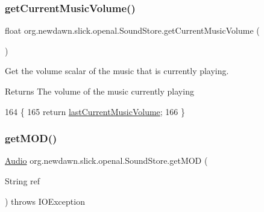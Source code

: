 \mbox{\label{classorg_1_1newdawn_1_1slick_1_1openal_1_1_sound_store_a36021d810d6956ef906c1083f02bed2b}} 
\subsubsection{\texorpdfstring{get\+Current\+Music\+Volume()}{getCurrentMusicVolume()}}
{\footnotesize\ttfamily float org.\+newdawn.\+slick.\+openal.\+Sound\+Store.\+get\+Current\+Music\+Volume (\begin{DoxyParamCaption}{ }\end{DoxyParamCaption})\hspace{0.3cm}{\ttfamily [inline]}}

Get the volume scalar of the music that is currently playing.

\begin{DoxyReturn}{Returns}
The volume of the music currently playing 
\end{DoxyReturn}

\begin{DoxyCode}
164                                          \{
165         \textcolor{keywordflow}{return} \mbox{\hyperlink{classorg_1_1newdawn_1_1slick_1_1openal_1_1_sound_store_a2e3c5e8604fb9229621276c4d1ea1ffd}{lastCurrentMusicVolume}};
166     \}
\end{DoxyCode}
\mbox{\label{classorg_1_1newdawn_1_1slick_1_1openal_1_1_sound_store_a246badbe8459ae466b1e1b41e838c3f5}} 
\subsubsection{\texorpdfstring{get\+M\+O\+D()}{getMOD()}\hspace{0.1cm}{\footnotesize\ttfamily [1/3]}}
{\footnotesize\ttfamily \mbox{\hyperlink{interfaceorg_1_1newdawn_1_1slick_1_1openal_1_1_audio}{Audio}} org.\+newdawn.\+slick.\+openal.\+Sound\+Store.\+get\+M\+OD (\begin{DoxyParamCaption}\item[{String}]{ref }\end{DoxyParamCaption}) throws I\+O\+Exception\hspace{0.3cm}{\ttfamily [inline]}}

